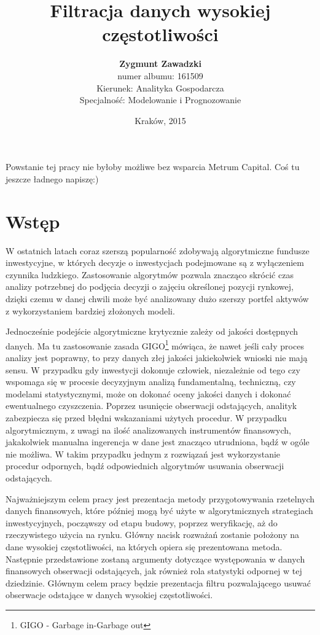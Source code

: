 \documentclass[a4paper,12pt,openany, DIV=calc, headsepline]{scrbook}
\author{{\LARGE \textbf{Zygmunt Zawadzki}}\\
numer albumu: 161509\\
Kierunek: Analityka Gospodarcza\\
Specjalność: Modelowanie i Prognozowanie}
\title{Filtracja danych wysokiej częstotliwości}
\date{Kraków, 2015}
\begin{document}
\maketitle


Powstanie tej pracy nie byłoby możliwe bez wsparcia Metrum Capital. Coś tu jeszcze ładnego napiszę:)

\tableofcontents
\chapter*{Wstęp}


W ostatnich latach coraz szerszą popularność zdobywają algorytmiczne fundusze inwestycyjne, w których decyzje o inwestycjach podejmowane są z wyłączeniem czynnika ludzkiego. Zastosowanie algorytmów pozwala znacząco skrócić czas analizy potrzebnej do podjęcia decyzji o zajęciu określonej pozycji rynkowej, dzięki czemu w danej chwili może być analizowany dużo szerszy portfel aktywów z wykorzystaniem bardziej złożonych modeli. 

Jednocześnie podejście algorytmiczne krytycznie zależy od jakości dostępnych danych. Ma tu zastosowanie zasada GIGO\footnote{GIGO - Garbage in-Garbage out} mówiąca, że nawet jeśli cały proces analizy jest poprawny, to przy danych złej jakości jakiekolwiek wnioski nie mają sensu. W przypadku gdy inwestycji dokonuje człowiek, niezależnie od tego czy wspomaga się w procesie decyzyjnym analizą fundamentalną, techniczną, czy modelami statystycznymi, może on dokonać oceny jakości danych i dokonać ewentualnego czyszczenia. Poprzez usunięcie obserwacji odstających, analityk zabezpiecza się przed błędni wskazaniami użytych procedur. W przypadku algorytmicznym, z uwagi na ilość analizowanych instrumentów finansowych, jakakolwiek manualna ingerencja w dane jest znacząco utrudniona, bądź w ogóle nie możliwa. W takim przypadku jednym z rozwiązań jest wykorzystanie procedur odpornych, bądź odpowiednich algorytmów usuwania obserwacji odstających.

Najważniejszym celem pracy jest prezentacja metody przygotowywania rzetelnych danych finansowych, które później mogą być użyte w algorytmicznych strategiach inwestycyjnych, począwszy od etapu budowy, poprzez weryfikację, aż do rzeczywistego użycia na rynku. Główny nacisk rozważań zostanie położony na dane wysokiej częstotliwości, na których opiera się prezentowana metoda. Następnie przedstawione zostaną argumenty dotyczące występowania w danych finansowych obserwacji odstających, jak również rola statystyki odpornej w tej dziedzinie. Głównym celem pracy będzie prezentacja filtru pozwalającego usuwać obserwacje odstające w danych wysokiej częstotliwości.
\end{document}
